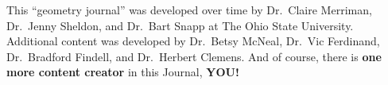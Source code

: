\documentclass[handout,numbers,nooutcomes,hints]{../ximera}
\begin{document}
%
%
%
%
%






This ``geometry journal'' was developed over time by Dr.\ Claire
Merriman, Dr.\ Jenny Sheldon, and Dr.\ Bart Snapp at The Ohio State
University. Additional content was developed by Dr.\ Betsy McNeal,
Dr.\ Vic Ferdinand, Dr.\ Bradford Findell, and Dr.\ Herbert Clemens.
And of course, there is \textbf{one more content creator} in this
Journal, \textbf{YOU!}
\end{document}
